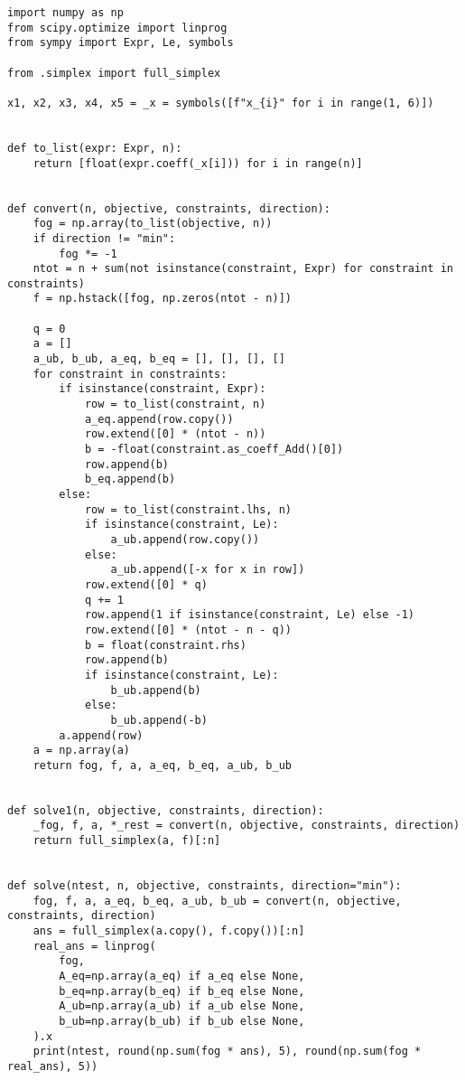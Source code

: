 \documentclass[11pt]{article}
\begin{document}
\begin{verbatim}
import numpy as np
from scipy.optimize import linprog
from sympy import Expr, Le, symbols

from .simplex import full_simplex

x1, x2, x3, x4, x5 = _x = symbols([f"x_{i}" for i in range(1, 6)])


def to_list(expr: Expr, n):
    return [float(expr.coeff(_x[i])) for i in range(n)]


def convert(n, objective, constraints, direction):
    fog = np.array(to_list(objective, n))
    if direction != "min":
        fog *= -1
    ntot = n + sum(not isinstance(constraint, Expr) for constraint in constraints)
    f = np.hstack([fog, np.zeros(ntot - n)])

    q = 0
    a = []
    a_ub, b_ub, a_eq, b_eq = [], [], [], []
    for constraint in constraints:
        if isinstance(constraint, Expr):
            row = to_list(constraint, n)
            a_eq.append(row.copy())
            row.extend([0] * (ntot - n))
            b = -float(constraint.as_coeff_Add()[0])
            row.append(b)
            b_eq.append(b)
        else:
            row = to_list(constraint.lhs, n)
            if isinstance(constraint, Le):
                a_ub.append(row.copy())
            else:
                a_ub.append([-x for x in row])
            row.extend([0] * q)
            q += 1
            row.append(1 if isinstance(constraint, Le) else -1)
            row.extend([0] * (ntot - n - q))
            b = float(constraint.rhs)
            row.append(b)
            if isinstance(constraint, Le):
                b_ub.append(b)
            else:
                b_ub.append(-b)
        a.append(row)
    a = np.array(a)
    return fog, f, a, a_eq, b_eq, a_ub, b_ub


def solve1(n, objective, constraints, direction):
    _fog, f, a, *_rest = convert(n, objective, constraints, direction)
    return full_simplex(a, f)[:n]


def solve(ntest, n, objective, constraints, direction="min"):
    fog, f, a, a_eq, b_eq, a_ub, b_ub = convert(n, objective, constraints, direction)
    ans = full_simplex(a.copy(), f.copy())[:n]
    real_ans = linprog(
        fog,
        A_eq=np.array(a_eq) if a_eq else None,
        b_eq=np.array(b_eq) if b_eq else None,
        A_ub=np.array(a_ub) if a_ub else None,
        b_ub=np.array(b_ub) if b_ub else None,
    ).x
    print(ntest, round(np.sum(fog * ans), 5), round(np.sum(fog * real_ans), 5))
\end{verbatim}
\end{document}
